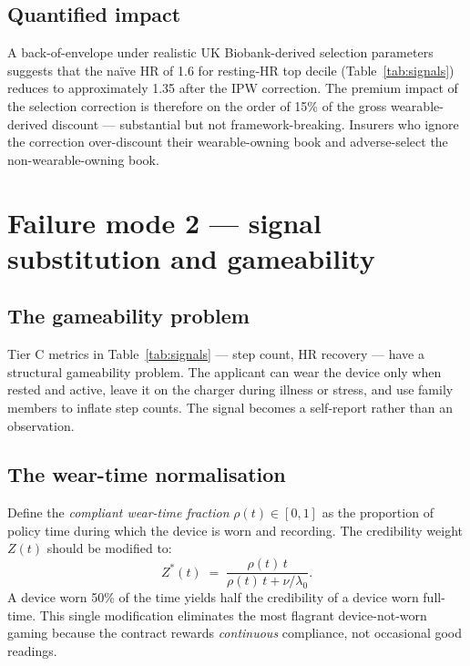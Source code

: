 \documentclass[11pt,a4paper]{article}
\let\origsection\section
\renewcommand{\section}{\clearpage\origsection}
\theoremstyle{ia}
\newcommand{\1}{\mathbf{1}}
\begin{document}
\subsection{Quantified impact}\label{ss:sel-impact}

A back-of-envelope under realistic UK Biobank-derived selection
parameters suggests that the na\"ive HR of 1.6 for resting-HR top
decile (Table~\ref{tab:signals}) reduces to approximately 1.35 after
the IPW correction. The premium impact of the selection correction
is therefore on the order of 15\% of the gross wearable-derived
discount --- substantial but not framework-breaking. Insurers who
ignore the correction over-discount their wearable-owning book and
adverse-select the non-wearable-owning book.

\section{Failure mode 2 --- signal substitution and gameability}\label{sec:gameability}

\subsection{The gameability problem}\label{ss:game}

Tier C metrics in Table~\ref{tab:signals} --- step count, HR
recovery --- have a structural gameability problem. The applicant
can wear the device only when rested and active, leave it on the
charger during illness or stress, and use family members to inflate
step counts. The signal becomes a self-report rather than an
observation.

\subsection{The wear-time normalisation}\label{ss:weartime}

Define the \emph{compliant wear-time fraction}
$\rho(t) \in [0,1]$ as the proportion of policy time during which
the device is worn and recording. The credibility weight $Z(t)$
should be modified to:
\begin{equation}\label{eq:Z-rho}
   Z^*(t) \;=\; \frac{\rho(t)\,t}{\rho(t)\,t + \nu/\lambda_0}.
\end{equation}
A device worn 50\% of the time yields half the credibility of a
device worn full-time. This single modification eliminates the
most flagrant device-not-worn gaming because the contract rewards
\emph{continuous} compliance, not occasional good readings.
\end{document}
